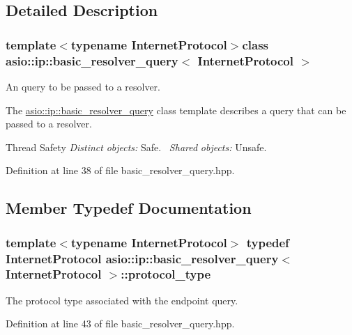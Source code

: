 \subsection{Detailed Description}
\subsubsection*{template$<$typename Internet\+Protocol$>$class asio\+::ip\+::basic\+\_\+resolver\+\_\+query$<$ Internet\+Protocol $>$}

An query to be passed to a resolver. 

The \hyperlink{classasio_1_1ip_1_1basic__resolver__query}{asio\+::ip\+::basic\+\_\+resolver\+\_\+query} class template describes a query that can be passed to a resolver.

\begin{DoxyParagraph}{Thread Safety}
{\itshape Distinct} {\itshape objects\+:} Safe.~\newline
{\itshape Shared} {\itshape objects\+:} Unsafe. 
\end{DoxyParagraph}


Definition at line 38 of file basic\+\_\+resolver\+\_\+query.\+hpp.



\subsection{Member Typedef Documentation}
\hypertarget{classasio_1_1ip_1_1basic__resolver__query_afc47f8001caf9274f6f567ae541e224a}{}
\subsubsection[{protocol\+\_\+type}]{\setlength{\rightskip}{0pt plus 5cm}template$<$typename Internet\+Protocol$>$ typedef Internet\+Protocol {\bf asio\+::ip\+::basic\+\_\+resolver\+\_\+query}$<$ Internet\+Protocol $>$\+::{\bf protocol\+\_\+type}}\label{classasio_1_1ip_1_1basic__resolver__query_afc47f8001caf9274f6f567ae541e224a}


The protocol type associated with the endpoint query. 



Definition at line 43 of file basic\+\_\+resolver\+\_\+query.\+hpp.



